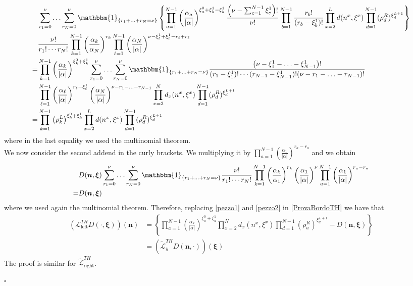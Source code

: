 \documentclass[10pt]{article}
\numberwithin{equation}{section}
\numberwithin{equation}{subsection}
\begin{document}
\begin{align}\label{pezzo1}
	&\sum_{r_{1}=0}^{\nu}\ldots\sum_{r_{N}=0}^{\nu}\mathbbm{1}_{\{r_{1}+\ldots+r_{N}=\nu\}}\left\{\prod_{a=1}^{N-1}\left(\frac{\alpha_{a}}{|\alpha|}\right)^{\xi_{a}^{0}+\xi_{k}^{1}-\xi_{k}^{1}}\frac{\left(\nu-\sum_{c=1}^{N-1}\xi_{c}^{1}\right)!}{\nu!}\prod_{b=1}^{N-1}\frac{r_{b}!}{(r_{b}-\xi^{1}_{b})!}\prod_{x=2}^{L}d(n^{x},\xi^{x})\prod_{d=1}^{N-1}(\rho_{d}^{R})^{\xi_{d}^{L+1}}\right\}\nonumber\\&	\frac{\nu!}{r_{1}!\cdots r_{N}!}\prod_{k=1}^{N-1}\left(\frac{\alpha_{k}}{\alpha_{N}}\right)^{r_{k}}\prod_{\ell=1}^{N-1}\left(\frac{\alpha_{N}}{|\alpha|}\right)^{\nu-\xi_{\ell}^{1}+\xi_{\ell}^{1}-r_{\ell}+r_{\ell}}\nonumber\\=&
	\prod_{k=1}^{N-1}\left(\frac{\alpha_{k}}{|\alpha|}\right)^{\xi_{k}^{0}+\xi_{k}^{1}}\sum_{r_{1}=0}^{\nu}\ldots\sum_{r_{N}=0}^{\nu}\mathbbm{1}_{\{r_{1}+\ldots+r_{N}=\nu\}}	\frac{\left(\nu-\xi_{1}^{1}-\ldots-\xi_{N-1}^{1}\right)!}{(r_{1}-\xi_{1}^{1})!\cdots(r_{N-1}-\xi_{N-1}^{1})!(\nu-r_{1}-\ldots-r_{N-1})!}\nonumber\\&
	\prod_{\ell=1}^{N-1}\left(\frac{\alpha_{\ell}}{|\alpha|}\right)^{r_{\ell}-\xi_{\ell}^{1}}\left(\frac{\alpha_{N}}{|\alpha|}\right)^{\nu-r_{1}-\ldots-r_{N-1}}\prod_{x=2}^{N}d_{x}(n^{x},\xi^{x})\prod_{d=1}^{N-1}(\rho_{d}^{R})^{\xi_{d}^{L+1}}\nonumber
	\\=&
	\prod_{k=1}^{N-1}\left(\rho_{k}^{L}\right)^{\xi_{k}^{0}+\xi_{k}^{1}}\prod_{x=2}^{L}d(n^{x},\xi^{x})\prod_{d=1}^{N-1}(\rho_{d}^{R})^{\xi_{d}^{L+1}}
\end{align}
where in the last equality we used the multinomial theorem. \\ We now consider the second addend in the curly brackets.
We multiplying it by $\prod_{a=1}^{N-1}\left(\frac{\alpha_{1}}{|\alpha|}\right)^{r_{a}-r_{a}}$ and we obtain
\begin{equation}\label{pezzo2}
	\begin{split}
		&D(\bm{n},\bm{\xi})\sum_{r_{1}=0}^{\nu}\ldots\sum_{r_{N}=0}^{\nu}\mathbbm{1}_{\{r_{1}+\ldots+r_{N}=\nu\}}\frac{\nu!}{r_{1}!\cdots r_{N}!}\prod_{k=1}^{N-1}\left(\frac{\alpha_{k}}{\alpha_{1}}\right)^{r_{k}}\left(\frac{\alpha_{1}}{|\alpha|}\right)^{\nu}\prod_{a=1}^{N-1}\left(\frac{\alpha_{1}}{|\alpha|}\right)^{r_{a}-r_{a}}\\=&D(\bm{n},\bm{\xi})
	\end{split}
\end{equation}
where we used again the multinomial theorem. Therefore, replacing \eqref{pezzo1} and \eqref{pezzo2} in \eqref{ProvaBordoTH} we have that
\begin{align}
	\left(\mathcal{L}_{\text{left}}^{TH}D(\cdot,\bm{\xi})\right)(\bm{n})&=\left\{\prod_{a=1}^{N-1}\left(\frac{\alpha_{k}}{|\alpha|}\right)^{\xi_{a}^{0}+\xi_{a}^{1}}\prod_{x=2}^{N}d_{x}(n^{x},\xi^{x})\prod_{d=1}^{N-1}(\rho_{a}^{R})^{\xi_{d}^{L+1}}-D(\bm{n},\bm{\xi})\right\}
	\\&=
	\left(\widetilde{\mathcal{L}}_{y}^{TH}D(\bm{n},\cdot)\right)(\bm{\xi})
\end{align}
The proof is similar for $\widetilde{\mathcal{L}}_{\text{right}}^{TH}$. 
\begin{flushright}
	$\square$
\end{flushright}
\end{document}
